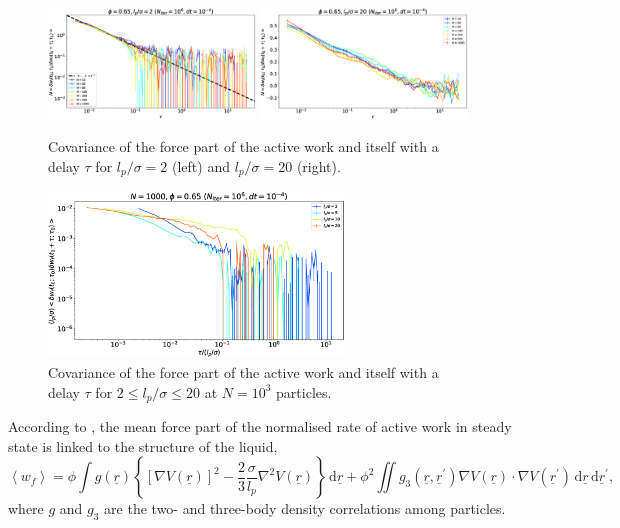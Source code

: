 \documentclass[10pt]{article}
\begin{document}
\begin{figure}[H]
\centering
\includegraphics[width=0.49\textwidth]{crossCorForceForce_Dk6500_Ll2000_Em2000.eps}
\hfill
\includegraphics[width=0.49\textwidth]{crossCorForceForce_Dk6500_Lm2000_Em2000.eps}
\caption{Covariance of the force part of the active work and itself with a delay $\tau$ for $l_p/\sigma = 2$ (left) and $l_p/\sigma = 20$ (right).}
\label{crossCorForceLP}
\end{figure}

\begin{figure}[H]
\centering
\includegraphics[width=0.7\textwidth]{crossCorForceForce_No1000_Dk6500_Em2000.eps}
\caption{Covariance of the force part of the active work and itself with a delay $\tau$ for $2 \leq l_p/\sigma \leq 20$ at $N=10^3$ particles.}
\label{crossCorForceN}
\end{figure}

According to \cite{tociu_how_2018}, the mean force part of the normalised rate of active work in steady state is linked to the structure of the liquid,
\begin{equation}
\left<w_f\right> = \phi \int g(\underline{r}) \left\{[\nabla V(\underline{r})]^2 - \frac{2}{3}\frac{\sigma}{l_p} \nabla^2 V(\underline{r})\right\} \, \text{d}\underline{r} + \phi^2 \iint g_3(\underline{r}, \underline{r}^{\prime}) \nabla V(\underline{r}) \cdot \nabla V(\underline{r}^{\prime}) \, \text{d}\underline{r} \, \text{d}\underline{r}^{\prime},
\end{equation}
where $g$ and $g_3$ are the two- and three-body density correlations among particles.\\
\end{document}
